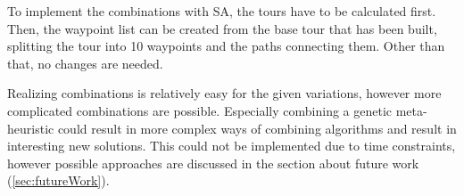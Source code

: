 To implement the combinations with SA, the tours have to be calculated first.
Then, the waypoint list can be created from the base tour that has been built, splitting the tour into 10 waypoints and the paths connecting them. 
Other than that, no changes are needed.

Realizing combinations is relatively easy for the given variations, however more complicated combinations are possible.
Especially combining a genetic meta-heuristic could result in more complex ways of combining algorithms and result in interesting new solutions. 
This could not be implemented due to time constraints, however possible approaches are discussed in the section about future work (\ref{sec:futureWork}).
